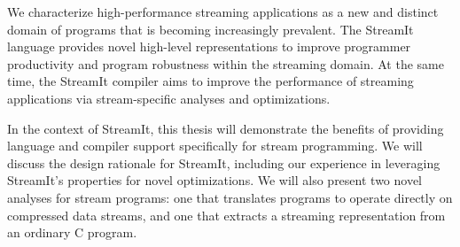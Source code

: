 We characterize high-performance streaming applications as a new and
distinct domain of programs that is becoming increasingly prevalent.
The StreamIt language provides novel high-level representations to
improve programmer productivity and program robustness within the
streaming domain.  At the same time, the StreamIt compiler aims to
improve the performance of streaming applications via stream-specific
analyses and optimizations.

In the context of StreamIt, this thesis will demonstrate the benefits
of providing language and compiler support specifically for stream
programming.  We will discuss the design rationale for StreamIt,
including our experience in leveraging StreamIt's properties for novel
optimizations.  We will also present two novel analyses for stream
programs: one that translates programs to operate directly on
compressed data streams, and one that extracts a streaming
representation from an ordinary C program.
